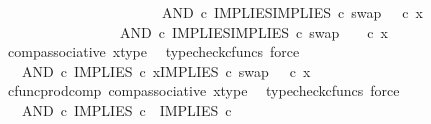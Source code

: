\begin{isabellebody}
\ \ \ \ \ \ \ \ \isamarkupfalse%
\ {\isacharminus}{\kern0pt}\ \isanewline
\ \ \ \ \ \ \ \ \ \ \isamarkupfalse%
\ {\isachardoublequoteopen}{\isacharparenleft}{\kern0pt}AND\ {\isasymcirc}\isactrlsub c\ {\isasymlangle}IMPLIES{\isacharcomma}{\kern0pt}IMPLIES\ {\isasymcirc}\isactrlsub c\ swap\ {\isasymOmega}\ {\isasymOmega}{\isasymrangle}{\isacharparenright}{\kern0pt}\ {\isasymcirc}\isactrlsub c\ x\ {\isacharequal}{\kern0pt}\ \ \ \ \isanewline
\ \ \ \ \ \ \ \ \ \ \ \ \ \ \ \ \ AND\ {\isasymcirc}\isactrlsub c\ {\isasymlangle}IMPLIES{\isacharcomma}{\kern0pt}IMPLIES\ {\isasymcirc}\isactrlsub c\ swap\ {\isasymOmega}\ {\isasymOmega}{\isasymrangle}\ \ {\isasymcirc}\isactrlsub c\ x{\isachardoublequoteclose}\isanewline
\ \ \ \ \ \ \ \ \ \ \ \ \isamarkupfalse%
\ comp{\isacharunderscore}{\kern0pt}associative{}\ x{\isacharunderscore}{\kern0pt}type\ \isamarkupfalse%
\ {\isacharparenleft}{\kern0pt}typecheck{\isacharunderscore}{\kern0pt}cfuncs{\isacharcomma}{\kern0pt}\ force{\isacharparenright}{\kern0pt}\isanewline
\ \ \ \ \ \ \ \ \ \ \isamarkupfalse%
\ \isamarkupfalse%
\ {\isachardoublequoteopen}{\isachardot}{\kern0pt}{\isachardot}{\kern0pt}{\isachardot}{\kern0pt}\ {\isacharequal}{\kern0pt}\ AND\ {\isasymcirc}\isactrlsub c\ {\isasymlangle}IMPLIES\ {\isasymcirc}\isactrlsub c\ x{\isacharcomma}{\kern0pt}IMPLIES\ {\isasymcirc}\isactrlsub c\ swap\ {\isasymOmega}\ {\isasymOmega}\ {\isasymcirc}\isactrlsub c\ x{\isasymrangle}{\isachardoublequoteclose}\isanewline
\ \ \ \ \ \ \ \ \ \ \ \ \isamarkupfalse%
\ cfunc{\isacharunderscore}{\kern0pt}prod{\isacharunderscore}{\kern0pt}comp\ comp{\isacharunderscore}{\kern0pt}associative{}\ x{\isacharunderscore}{\kern0pt}type\ \isamarkupfalse%
\ {\isacharparenleft}{\kern0pt}typecheck{\isacharunderscore}{\kern0pt}cfuncs{\isacharcomma}{\kern0pt}\ force{\isacharparenright}{\kern0pt}\isanewline
\ \ \ \ \ \ \ \ \ \ \isamarkupfalse%
\ \isamarkupfalse%
\ {\isachardoublequoteopen}{\isachardot}{\kern0pt}{\isachardot}{\kern0pt}{\isachardot}{\kern0pt}\ {\isacharequal}{\kern0pt}\ AND\ {\isasymcirc}\isactrlsub c\ {\isasymlangle}IMPLIES\ {\isasymcirc}\isactrlsub c\ {\isasymlangle}{\isasymf}{\isacharcomma}{\kern0pt}{\isasymf}{\isasymrangle}{\isacharcomma}{\kern0pt}\ IMPLIES\ {\isasymcirc}\isactrlsub c\ {\isasymlangle}{\isasymf}{\isacharcomma}{\kern0pt}{\isasymf}{\isasymrangle}{\isasymrangle}{\isachardoublequoteclose}\isanewline
\ \ \ \ \ \ \ \ \ \ \ \ \isamarkupfalse%

\end{isabellebody}

